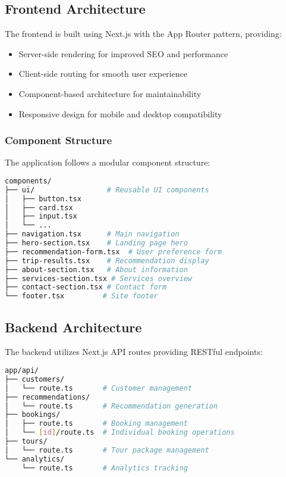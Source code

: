 \documentclass[12pt,a4paper]{article}
\begin{document}
\subsection{Frontend Architecture}
The frontend is built using Next.js with the App Router pattern, providing:
\begin{itemize}
    \item Server-side rendering for improved SEO and performance
    \item Client-side routing for smooth user experience
    \item Component-based architecture for maintainability
    \item Responsive design for mobile and desktop compatibility
\end{itemize}

\subsubsection{Component Structure}
The application follows a modular component structure:
\begin{lstlisting}[language=bash, caption=Frontend Component Structure]
components/
├── ui/                 # Reusable UI components
│   ├── button.tsx
│   ├── card.tsx
│   ├── input.tsx
│   └── ...
├── navigation.tsx      # Main navigation
├── hero-section.tsx    # Landing page hero
├── recommendation-form.tsx  # User preference form
├── trip-results.tsx    # Recommendation display
├── about-section.tsx   # About information
├── services-section.tsx # Services overview
├── contact-section.tsx # Contact form
└── footer.tsx         # Site footer
\end{lstlisting}

\subsection{Backend Architecture}
The backend utilizes Next.js API routes providing RESTful endpoints:

\begin{lstlisting}[language=bash, caption=API Route Structure]
app/api/
├── customers/
│   └── route.ts       # Customer management
├── recommendations/
│   └── route.ts       # Recommendation generation
├── bookings/
│   ├── route.ts       # Booking management
│   └── [id]/route.ts  # Individual booking operations
├── tours/
│   └── route.ts       # Tour package management
└── analytics/
    └── route.ts       # Analytics tracking
\end{lstlisting}
\end{document}
